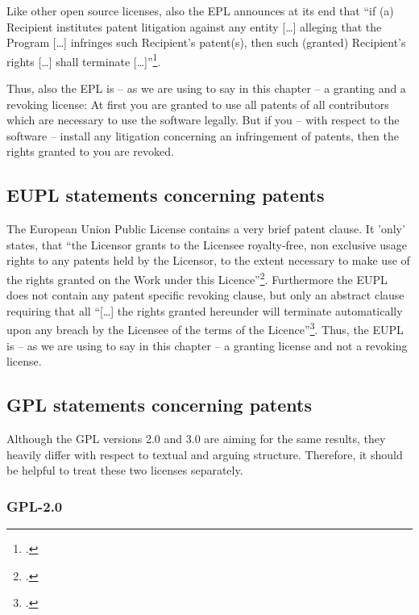 Like other open source licenses, also the EPL announces at its end that
\enquote{if (a) Recipient institutes patent litigation against any entity
[\ldots] alleging that the Program [\ldots] infringes such Recipient's
patent(s), then such (granted) Recipient's rights [\ldots] shall terminate
[\ldots]}\footcite[cf.][\nopage wp §7]{Epl10OsiLicense2005a}.

Thus, also the EPL is -- as we are using to say in this chapter -- a granting and
a revoking license: At first you are granted to use all patents of all
contributors which are necessary to use the software legally. But if you -- with
respect to the software -- install any litigation concerning an infringement of
patents, then the rights granted to you are revoked.

\subsection{EUPL statements concerning patents}\label{subsec:EupLPatentClause}
The European Union Public License contains a very brief patent clause. It 'only'
states, that \enquote{the Licensor grants to the Licensee royalty-free, non
exclusive usage rights to any patents held by the Licensor, to the extent
necessary to make use of the rights granted on the Work under this
Licence}\footcite[cf.][\nopage wp.\ §2 at its tail]{EuplLicense2007en}.
Furthermore the EUPL does not contain any patent specific revoking clause, but
only an abstract clause requiring that all \enquote{[\ldots] the rights granted
hereunder will terminate automatically upon any breach by the Licensee of the
terms of the Licence}\footcite[cf.][\nopage wp.\ §12]{EuplLicense2007en}. Thus,
the EUPL is -- as we are using to say in this chapter -- a granting license and
not a revoking license.

\subsection{GPL statements concerning patents}

Although the GPL versions 2.0 and 3.0 are aiming for the same results, they
heavily differ with respect to textual and arguing structure. Therefore, it
should be helpful to treat these two licenses separately.

\subsubsection {GPL-2.0} \label{subsec:Gpl20PatentClause}

